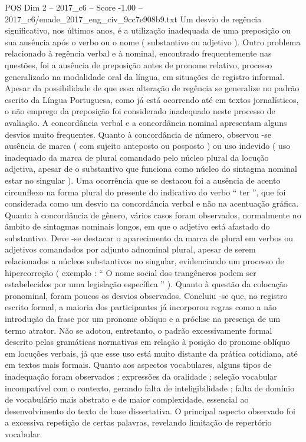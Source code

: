 \begin{textsample}{POS Dim 2 – 2017\_c6 – Score -1.00 – 2017\_c6/enade\_2017\_eng\_civ\_9cc7e908b9.txt}
Um desvio de regência significativo, nos últimos anos, é a utilização inadequada de uma preposição ou sua ausência após o verbo ou o nome ( substantivo ou adjetivo ).
Outro problema relacionado à regência verbal e à nominal, encontrado frequentemente nas questões, foi a ausência de preposição antes de pronome relativo, processo generalizado na modalidade oral da língua, em situações de registro informal.
Apesar da possibilidade de que essa alteração de regência se generalize no padrão escrito da Língua Portuguesa, como já está ocorrendo até em textos jornalísticos, o não emprego da preposição foi considerado inadequado neste processo de avaliação.
A concordância verbal e a concordância nominal apresentam alguns desvios muito frequentes.
Quanto à concordância de número, observou -se ausência de marca ( com sujeito anteposto ou posposto ) ou uso indevido ( uso inadequado da marca de plural comandado pelo núcleo plural da locução adjetiva, apesar de o substantivo que funciona como núcleo do sintagma nominal estar no singular ).
Uma ocorrência que se destacou foi a ausência de acento circunflexo na forma plural do presente do indicativo do verbo “ ter ”, que foi considerada como um desvio na concordância verbal e não na acentuação gráfica.
Quanto à concordância de gênero, vários casos foram observados, normalmente no âmbito de sintagmas nominais longos, em que o adjetivo está afastado do substantivo.
Deve -se destacar o aparecimento da marca de plural em verbos ou adjetivos comandados por adjunto adnominal plural, apesar de serem relacionados a núcleos substantivos no singular, evidenciando um processo de hipercorreção ( exemplo : “ O nome social dos trangêneros podem ser estabelecidos por uma legislação específica ” ).
Quanto à questão da colocação pronominal, foram poucos os desvios observados.
Concluiu -se que, no registro escrito formal, a maioria dos participantes já incorporou regras como a não introdução da frase por um pronome oblíquo e a próclise na presença de um termo atrator.
Não se adotou, entretanto, o padrão excessivamente formal descrito pelas gramáticas normativas em relação à posição do pronome oblíquo em locuções verbais, já que esse uso está muito distante da prática cotidiana, até em textos mais formais.
Quanto aos aspectos vocabulares, alguns tipos de inadequação foram observados : expressões da oralidade ; seleção vocabular incompatível com o contexto, gerando falta de inteligibilidade ; falta de domínio de vocabulário mais abstrato e de maior complexidade, essencial ao desenvolvimento do texto de base dissertativa.
O principal aspecto observado foi a excessiva repetição de certas palavras, revelando limitação de repertório vocabular.

\end{textsample}
